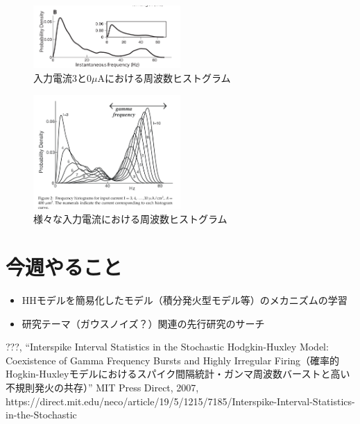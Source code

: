 \documentclass[dvipdfmx, A4j, twocolumn, 10.5pt]{jsarticle}
\begin{document}
\begin{figure}[h]
    \centering
    \includegraphics[width=0.5\textwidth]{images/frequency_3.png}
    \caption{入力電流3と0$\mu \mathrm{A}$における周波数ヒストグラム}
\end{figure}


\begin{figure}[h]
    \centering
    \includegraphics[width=0.5\textwidth]{images/frequency_i.png}
    \caption{様々な入力電流における周波数ヒストグラム}
\end{figure}




\vspace{\baselineskip}
\vspace{\baselineskip}



\section{今週やること}
\begin{itemize}
 \item HHモデルを簡易化したモデル（積分発火型モデル等）のメカニズムの学習
 \item 研究テーマ（ガウスノイズ？）関連の先行研究のサーチ
\end{itemize}




\begin{thebibliography}{99}
 ???, ``Interspike Interval Statistics in the Stochastic Hodgkin-Huxley Model: Coexistence of Gamma Frequency Bursts and Highly Irregular Firing（確率的Hogkin-Huxleyモデルにおけるスパイク間隔統計・ガンマ周波数バーストと高い不規則発火の共存）'' MIT Press Direct, 2007, https://direct.mit.edu/neco/article/19/5/1215/7185/Interspike-Interval-Statistics-in-the-Stochastic
\end{thebibliography}
\end{document}

